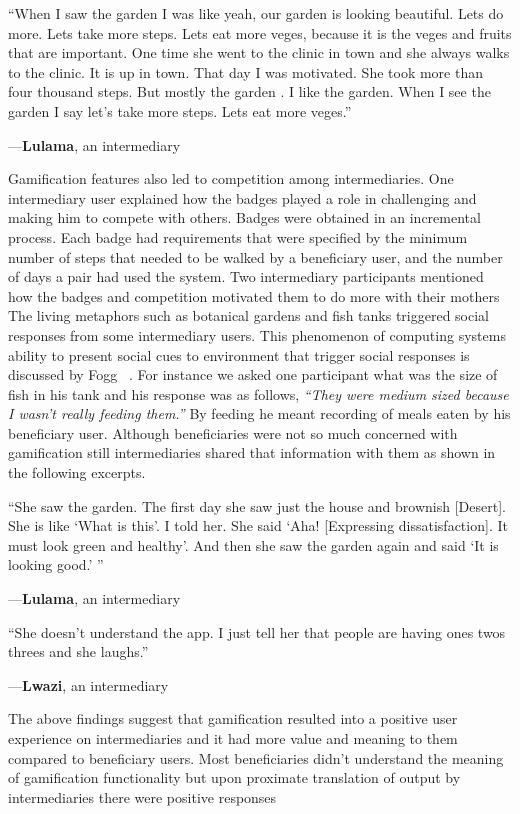 \documentclass{sig-alternate}
\newenvironment{myquote}
               {\list{}{\rightmargin   \leftmargin
                        \parsep        0in }%
                \item\relax}
               {\endlist}
\newcommand{\userquote}[2]{\begin{samepage}\begin{myquote} 
     \em{\small{#2\begin{flushright}---#1\end{flushright}}}
   \end{myquote}\end{samepage}}
\begin{document}
\userquote{\textbf{Lulama}, an intermediary} {``When I saw the garden I was like yeah, our garden is looking beautiful. Lets do more. Lets take more steps. Lets eat more veges, because it is the veges and fruits that are important. One time she 
went to the clinic in town and she always walks to the clinic. It is up in 
town. That day I was motivated. She took more than four thousand steps. But 
mostly the garden . I like the garden. When I see the garden I say let's take 
more steps. Lets eat more veges.''}

Gamification features also led to competition among intermediaries. One
intermediary user explained how the badges played a role in challenging and
making him to compete with others. Badges were obtained in an incremental
process. Each badge had requirements that were specified by the minimum 
number of steps that needed to be walked by a beneficiary user, and the 
number of days a pair had used the system. Two intermediary participants mentioned how
the badges and competition motivated them to do more with their mothers 
The living metaphors such as botanical gardens and fish tanks triggered
social responses from some intermediary users. This phenomenon of computing
systems ability to present social cues to environment that trigger social
responses is discussed by Fogg ~\cite{foggpersuasivebook}. For instance we
asked one participant what was the size of fish in his tank and his response
was as follows, \textit{``They were medium sized because I wasn't really
feeding them.''} By feeding he meant recording of meals eaten by his
beneficiary user.
Although beneficiaries were not so much concerned with gamification still intermediaries shared that information with them  as shown in the following excerpts. 

\userquote{\textbf{Lulama}, an intermediary} {``She saw the garden. The
first day she saw just the house and brownish [Desert]. She
is like `What is this'. I told her. She said `Aha! [Expressing
dissatisfaction]. It must look green and healthy'. And then
she saw the garden again and said `It is looking good.'
''}
\userquote{\textbf{Lwazi}, an intermediary} {``She doesn't understand the app. I just tell her that people are having ones twos threes and she laughs.''}
The above findings suggest that gamification resulted into a positive user 
experience on intermediaries and it had more value and meaning to them 
compared to beneficiary users. Most beneficiaries didn't understand the meaning of gamification functionality but upon proximate translation of output by intermediaries there were positive responses
\end{document}
